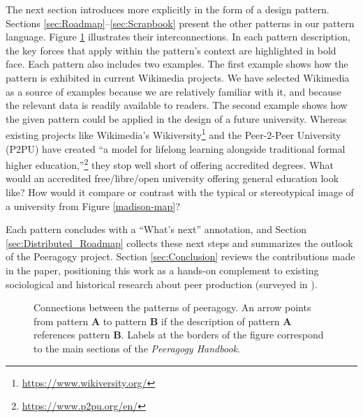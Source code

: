 The next section introduces  more explicitly in the form of a design pattern.  Sections \ref{sec:Roadmap}--\ref{sec:Scrapbook} present the other patterns in our pattern language.  Figure \ref{fig:connections} illustrates their interconnections.  In each pattern description, the key forces that apply within the pattern's context are highlighted in bold face.  Each pattern also includes two examples.  The first example shows how the pattern is exhibited in current Wikimedia projects.  We have selected Wikimedia as a source of examples because we are relatively familiar with it, and because the relevant data is readily available to readers.  The second example shows how the given pattern could be applied in the design of a future university.  Whereas existing projects like Wikimedia's Wikiversity\footnote{\url{https://www.wikiversity.org/}} and the Peer-2-Peer University (P2PU) have created ``a model for lifelong learning alongside traditional formal higher education,''\footnote{\url{https://www.p2pu.org/en/}} they stop well short of offering accredited degrees.  What would an accredited free/libre/open university offering general education look like?  How would it compare or contrast with the typical or stereotypical image of a university from Figure \ref{madison-map}?

Each pattern concludes with a ``What's next'' annotation, and Section \ref{sec:Distributed_Roadmap} collects these next steps and summarizes the outlook of the Peeragogy project.  Section \ref{sec:Conclusion} reviews the contributions made in the paper, positioning this work as a hands-on complement to existing sociological and historical research about peer production (surveyed in \cite{benkler2015peer}).

\begin{figure}
\vspace{-.9in}
{\centering


\par
}
\vspace{-.9in}
\caption{Connections between the patterns of peeragogy.  An arrow points from pattern \textbf{A} to pattern \textbf{B} if the description of pattern \textbf{A} references pattern \textbf{B}. Labels at the borders of the figure correspond to the main sections of the \emph{Peeragogy Handbook}.\label{fig:connections}}
\end{figure}

